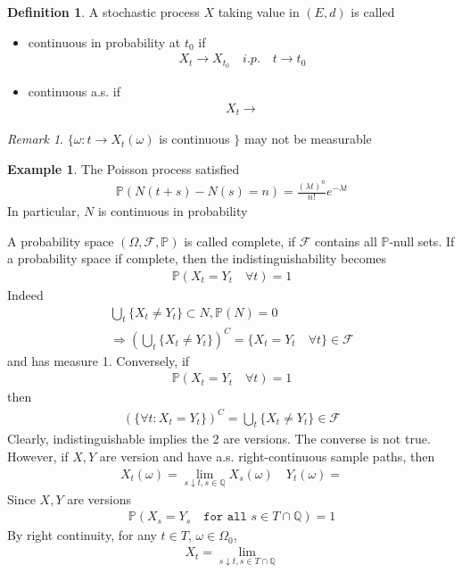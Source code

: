 \documentclass[a4paper,11pt]{book}
\theoremstyle{definition}
\newtheorem{definition}{Definition}[section]
\newtheorem*{example}{Example}
\theoremstyle{remark}
\newtheorem*{remark}{Remark}
\begin{document}
\begin{definition}
	A stochastic process $X$ taking value in $(E, d)$ is called
	\begin{itemize}
		\item continuous in probability at $t_0$ if
		\begin{align*}
			X_t \rightarrow X_{t_0} \quad i.p.\quad t \rightarrow t_0
		\end{align*}
		\item continuous a.s. if
		\begin{align*}
			X_t \rightarrow 
		\end{align*}
	\end{itemize}	
\end{definition}
\begin{remark}
$\{\omega: t \rightarrow X_t(\omega)$ is continuous $\}$ may not be measurable
\end{remark}

\begin{example}
The Poisson process satisfied
\begin{align*}
	\mathbb{P}(N(t + s) - N(s) = n) = \frac{(\lambda t)^n}{n!}e^{-\lambda t}
\end{align*}	
In particular, $N$ is continuous in probability
\end{example}

A probability space $(\Omega, \mathcal{F}, \mathbb{P})$ is called complete, if $\mathcal{F}$ contains all $\mathbb{P}$-null sets. If a probability space if complete, then the indistinguishability becomes
\begin{align*}
	\mathbb{P}(X_t = Y_t \quad\forall t) = 1
\end{align*}
Indeed
\begin{align*}
	\bigcup_t \{X_t \neq Y_t \} \subset N, \mathbb{P}(N) = 0\\
	\Rightarrow (\bigcup_t \{X_t \neq Y_t \})^C = \{X_t = Y_t \quad\forall t\} \in \mathcal{F}
\end{align*}
and has measure 1. Conversely, if
\begin{align*}
	\mathbb{P}(X_t = Y_t \quad \forall t ) = 1
\end{align*}
then
\begin{align*}
	(\{\forall t: X_t = Y_t\})^C = \bigcup_t \{X_t \neq Y_t\} \in \mathcal{F}
\end{align*}
Clearly, indistinguishable implies the 2 are versions. The converse is not true. However, if $X, Y$ are version and have a.s. right-continuous sample paths, then 
\begin{align*}
	X_t(\omega) = \lim_{s \downarrow t, s \in \mathbb{Q}} X_s(\omega) \quad Y_t(\omega) = 
\end{align*}
Since $X,Y$ are versions
\begin{align*}
	\mathbb{P}(X_s = Y_s \quad \texttt{for all } s \in T\cap \mathbb{Q}) = 1
\end{align*}
By right continuity, for any $t \in T$, $\omega \in \Omega_0$, 
\begin{align*}
	X_t = \lim_{s \downarrow t, s \in T \cap \mathbb{Q}}
\end{align*}
\end{document}
